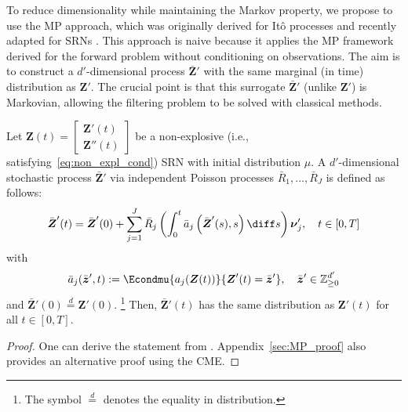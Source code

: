 To reduce dimensionality while maintaining the Markov property, we propose to use the \acf{MP} approach, which was originally derived for It\^o processes \cite{Gyongy1986MP, Bayer2019Implied} and recently adapted for \acp{SRN} \cite{Hammouda2023MP}. This approach is naive because it applies the \ac{MP} framework derived for the forward problem without conditioning on observations. The aim is to construct a $d'$-dimensional process $\bar{\boldsymbol{Z}}'$ with the same marginal (in time) distribution as $\boldsymbol{Z}'$. The crucial point is that this surrogate $\bar{\boldsymbol{Z}}'$ (unlike $\boldsymbol{Z}'$) is Markovian, allowing the filtering problem to be solved with classical methods.

\begin{theorem}
    \label{th:MP}
    Let $\boldsymbol{Z}(t) = \begin{bmatrix} \boldsymbol{Z}'(t) \\ \boldsymbol{Z}''(t)\end{bmatrix}$ be a non-explosive (i.e., satisfying~\ref{eq:non_expl_cond}) \ac{SRN} with initial distribution $\mu$. 
    A $d'$-dimensional stochastic process $\bar{\boldsymbol{Z}}'$ via independent Poisson processes $\bar{R}_1, \dots, \bar{R}_J$ is defined as follows:
    \begin{equation}
    \label{eq:MP_model}
        \bar{\boldsymbol{Z}}'(t) = \bar{\boldsymbol{Z}}'(0) + \sum_{j=1}^{J}  \bar{R}_j \left( \int_0^t \bar{a}_j \left( \bar{\boldsymbol{Z}}'(s), s \right) \diff s \right) \boldsymbol{\nu}_{j}' , \quad t \in [0,T]
    \end{equation}
    with 
    \begin{equation}
    \label{eq:MP_a_bar_def}
        \bar{a}_j (\bar{\boldsymbol{z}}', t) := \Econdmu{ a_j(\boldsymbol{Z}(t)) }{ \boldsymbol{Z}'(t) = \bar{\boldsymbol{z}}'}, \quad \bar{\boldsymbol{z}}' \in \mathbb{Z}_{\geq 0}^{d'}
    \end{equation}
    and $\bar{\boldsymbol{Z}}'(0) \overset{d}{=} \boldsymbol{Z}'(0)$. \footnote{The symbol $\overset{d}{=}$ denotes the equality in distribution.} Then, $\bar{\boldsymbol{Z}}'(t)$ has the same distribution as $\boldsymbol{Z}'(t)$ for all $t \in [0, T]$.
\end{theorem}


\begin{proof}
    One can derive the statement from \cite[Theorem 3.1]{Hammouda2023MP}. Appendix~\ref{sec:MP_proof} also provides an alternative proof using the \ac{CME}.
\end{proof}


